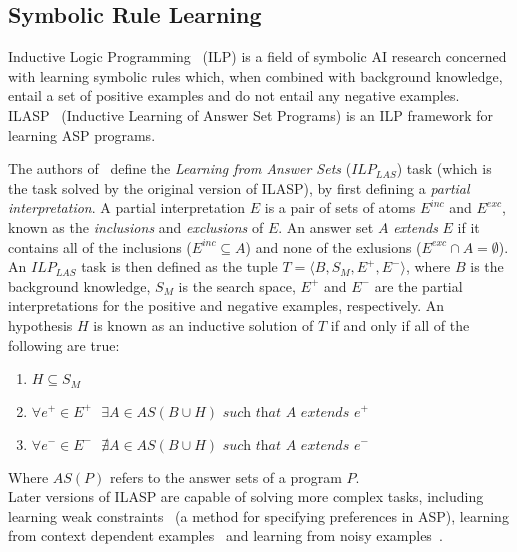\documentclass[../interim.tex]{subfiles}
\begin{document}
\subsection{Symbolic Rule Learning}

Inductive Logic Programming~\cite{ilp-intro} (ILP) is a field of symbolic AI research concerned with learning symbolic rules which, when combined with background knowledge, entail a set of positive examples and do not entail any negative examples. ILASP~\cite{ilasp-system} (Inductive Learning of Answer Set Programs) is an ILP framework for learning ASP programs.

The authors of~\cite{ilasp-1} define the \textit{Learning from Answer Sets} ($ILP_{LAS}$) task (which is the task solved by the original version of ILASP), by first defining a \textit{partial interpretation}. A partial interpretation $E$ is a pair of sets of atoms $E^{inc}$ and $E^{exc}$, known as the \textit{inclusions} and \textit{exclusions} of $E$. An answer set $A$ \textit{extends} $E$ if it contains all of the inclusions ($E^{inc} \subseteq A$) and none of the exlusions ($E^{exc} \cap A = \emptyset$). An $ILP_{LAS}$ task is then defined as the tuple $T = \langle B, S_M, E^+, E^- \rangle$, where $B$ is the background knowledge, $S_M$ is the search space, $E^+$ and $E^-$ are the partial interpretations for the positive and negative examples, respectively. An hypothesis $H$ is known as an inductive solution of $T$ if and only if all of the following are true:
\begin{enumerate}
  \item $H \subseteq S_M$
  \item $\forall e^+ \in E^+ \text{ } \exists A \in AS(B \cup H) \textit{ such that } A \textit{ extends } e^+$
  \item $\forall e^- \in E^- \text{ } \nexists A \in AS(B \cup H) \textit{ such that } A \textit{ extends } e^-$
\end{enumerate}
\noindent
{\footnotesize Where $AS(P)$ refers to the answer sets of a program $P$.} \\

Later versions of ILASP are capable of solving more complex tasks, including learning weak constraints~\cite{ilasp-wc} (a method for specifying preferences in ASP), learning from context dependent examples~\cite{ilasp-cde} and learning from noisy examples~\cite{ilasp-noisy}.
\end{document}
